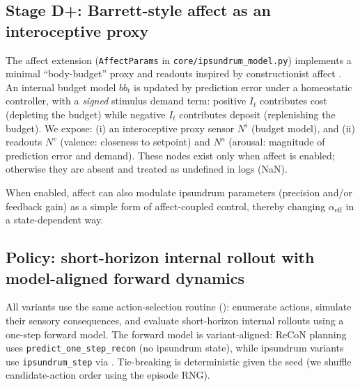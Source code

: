 \documentclass[letterpaper]{article} %
\begin{document}
\subsection{Stage D+: Barrett-style affect as an interoceptive proxy}
The affect extension (\texttt{AffectParams} in \texttt{core/ipsundrum\_model.py}) implements a minimal ``body-budget'' proxy and readouts inspired by constructionist affect \citep{Barrett2017HowEmotions}.
An internal budget model $bb_t$ is updated by prediction error under a homeostatic controller, with a \emph{signed} stimulus demand term: positive $I_t$ contributes cost (depleting the budget) while negative $I_t$ contributes deposit (replenishing the budget).
We expose:
(i) an interoceptive proxy sensor $N^i$ (budget model), and
(ii) readouts $N^v$ (valence: closeness to setpoint) and $N^a$ (arousal: magnitude of prediction error and demand).
These nodes exist only when affect is enabled; otherwise they are absent and treated as undefined in logs (NaN).

When enabled, affect can also modulate ipsundrum parameters (precision and/or feedback gain) as a simple form of affect-coupled control, thereby changing $\alpha_{\text{eff}}$ in a state-dependent way.

\subsection{Policy: short-horizon internal rollout with model-aligned forward dynamics}
All variants use the same action-selection routine (): enumerate actions, simulate their sensory consequences, and evaluate short-horizon internal rollouts using a one-step forward model.
The forward model is variant-aligned: ReCoN planning uses \texttt{predict\_one\_step\_recon} (no ipsundrum state), while ipsundrum variants use \texttt{ipsundrum\_step} via .
Tie-breaking is deterministic given the seed (we shuffle candidate-action order using the episode RNG).
\end{document}
